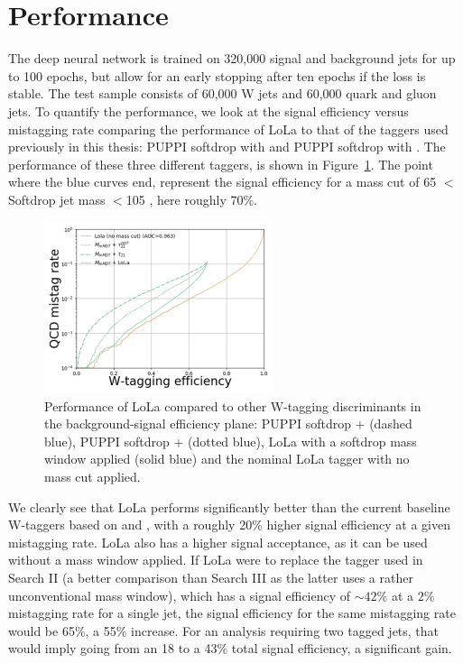 \section{Performance}
\label{sec:lola:performance}
The deep neural network is trained on 320,000 signal and background jets for up to 100 epochs, but allow for an early stopping after ten epochs if the loss is stable. The test sample consists of 60,000 W jets and 60,000 quark and gluon jets. To quantify the performance, we look at the signal efficiency versus mistagging rate comparing the performance of LoLa to that of the taggers used previously in this thesis: PUPPI softdrop with \nsubj and PUPPI softdrop with \ddt. The performance of these three different taggers, is shown in Figure~\ref{fig:lola:roc}. The point where the blue curves end, represent the signal efficiency for a mass cut of 65 $<$ Softdrop jet mass $< $105 \GeV, here roughly 70\%.
\begin{figure}[h!]
\centering
\includegraphics[width=0.6\textwidth]{figures/vtagging/AN-18-099/training/LoLa-comp-roc.pdf}
\caption{Performance of LoLa compared to other W-tagging discriminants in the background-signal efficiency plane: PUPPI softdrop + \nsubj (dashed blue), PUPPI softdrop + \ddt (dotted blue), LoLa with a softdrop mass window applied (solid blue) and the nominal LoLa tagger with no mass cut applied.}
\label{fig:lola:roc}
\end{figure}
We clearly see that LoLa performs significantly better than the current baseline W-taggers based on \nsubj and \ddt, with a roughly 20\% higher signal efficiency at a given mistagging rate. LoLa also has a higher signal acceptance, as it can be used without a mass window applied. If LoLa were to replace the tagger used in Search II (a better comparison than Search III as the latter uses a rather unconventional mass window), which has a signal efficiency of $\sim42\%$ at a $2\%$ mistagging rate for a single jet, the signal efficiency for the same mistagging rate would be 65\%, a 55\% increase. For an analysis requiring two tagged jets, that would imply going from an 18 to a 43\% total signal efficiency, a significant gain.

